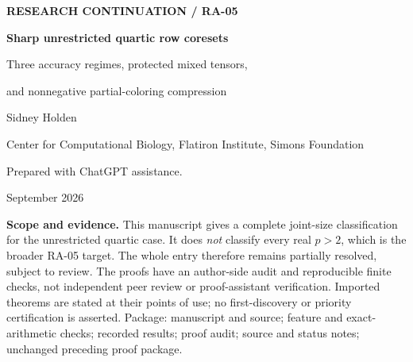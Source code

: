 \documentclass[11pt]{article}
\theoremstyle{remark}\newtheorem{remark}[theorem]{Remark}
\newcommand{\wt}{\widetilde}
\numberwithin{equation}{section}
\begin{document}
\begin{titlepage}
\vspace*{0.35in}
{\small\sffamily\bfseries RESEARCH CONTINUATION / RA-05}\par\vspace{0.2in}
{\LARGE\bfseries Sharp unrestricted quartic row coresets}\par\vspace{0.12in}
{\large Three accuracy regimes, protected mixed tensors,\par and nonnegative partial-coloring compression}\par\vspace{0.25in}
{\large Sidney Holden}\par
{\small Center for Computational Biology, Flatiron Institute, Simons Foundation}\par
{\small Prepared with ChatGPT assistance.}\par September 2026
\vspace{0.25in}
\begin{abstract}
Let $S_4(k,\varepsilon)$ be the worst-case minimum support of a nonnegative strong coreset on original rows for quartic Euclidean subspace approximation, with query dimension at most $k$. There is no restriction on the rank of the input matrix. We prove
\[
 S_4(k,\varepsilon)=\wt\Theta\!\left(
 \min\left\{\frac{k^2}{\varepsilon^2},\,
 \frac{k^{5/2}}{\varepsilon}+\frac{k}{\varepsilon^2}\right\}\right)
\]
for every $k\ge1$ and $0<\varepsilon<1/2$. More precisely, the lower bound has an absolute constant and no logarithmic loss, while the upper bound has at most a ninth power of $\log(2k/\varepsilon)$. The new upper bound is
$O((k^{5/2}/\varepsilon+k/\varepsilon^2)\log^5(2k/\varepsilon))$.
It combines an optimal-head split, exact protection of a controlled number of mixed-tensor directions, anisotropic matrix-Gaussian estimates, and repeated partial coloring with frozen fractional exceptions. Every final weight is nonnegative and attached to an original row.

The lower bound is reproved, including both variable-density hyperplane examples and arbitrary-rank orthogonal blocks. Thus the earlier rank restriction is removed at $p=4$: in particular, accuracy $\varepsilon=k^{-2}$ has optimal size $\wt\Theta(k^5)$ rather than the previously surviving interval from $k^5$ to $k^6$.
\end{abstract}
\vspace{0.12in}
\textbf{Scope and evidence.} This manuscript gives a complete joint-size classification for the unrestricted quartic case. It does \emph{not} classify every real $p>2$, which is the broader RA-05 target. The whole entry therefore remains partially resolved, subject to review. The proofs have an author-side audit and reproducible finite checks, not independent peer review or proof-assistant verification. Imported theorems are stated at their points of use; no first-discovery or priority certification is asserted.
\vfill
{\small Package: manuscript and source; feature and exact-arithmetic checks; recorded results; proof audit; source and status notes; unchanged preceding proof package.}
\end{titlepage}
{\small\setlength{\parskip}{0pt}\tableofcontents}
\newpage
\end{document}
